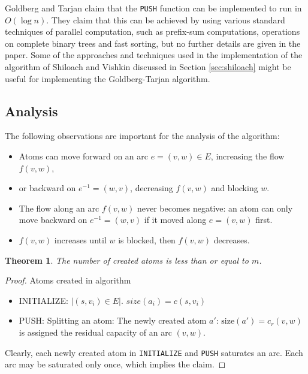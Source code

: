 \documentclass[a4paper,10pt, twocolumn]{article}
\newtheorem{theorem}[lemma]{Theorem}
\begin{document}
Goldberg and Tarjan \cite{goldberg89} claim that the \lstinline|PUSH| function can be implemented to run in $O(\log n)$. They claim that this can be achieved by using various standard techniques of parallel computation, such as prefix-sum computations, operations on complete binary trees and fast sorting, but no further details are given in the paper. Some of the approaches and techniques used in the implementation of the algorithm of Shiloach and Vishkin discussed in Section \ref{sec:shiloach} might be useful for implementing the Goldberg-Tarjan algorithm.


\subsection{Analysis}
\label{sec:gt_analysis}
The following observations are important for the analysis of the algorithm:
\begin{itemize}
	\item Atoms can move forward on an arc $e=(v,w) \in E$, increasing the flow $f(v,w)$,
	\item or backward on $e^{-1}=(w,v)$, decreasing $f(v,w)$ and blocking $w$. 
	\item The flow along an arc $f(v,w)$ never becomes negative: an atom can only move backward on $e^{-1}=(w,v)$ if it moved along $e=(v,w)$ first.
	\item $f(v,w)$ increases until $w$ is blocked, then $f(v,w)$ decreases.
\end{itemize}

\begin{theorem}
The number of created atoms is less than or equal to $m$.
\end{theorem}
\begin{proof}
Atoms created in algorithm
\begin{itemize}
	\item INITIALIZE: $\lvert (s,v_i) \in E \rvert$. $size(a_i) = c(s,v_i)$
	\item PUSH: Splitting an atom: The newly created atom $a'$: $\mathrm{size}(a') = c_r(v,w)$ is assigned the residual capacity of an arc $(v,w)$.
\end{itemize}
Clearly, each newly created atom in \lstinline|INITIALIZE| and \lstinline|PUSH| saturates an arc. Each arc may be saturated only once, which implies the claim.
\end{proof}
\end{document}
